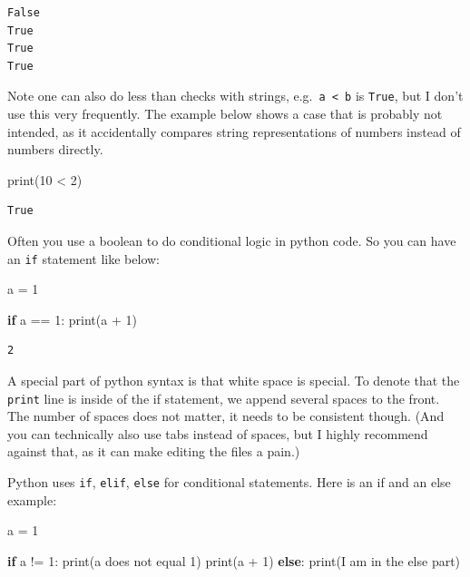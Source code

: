 \documentclass[
  letterpaper,
]{scrbook}
\newenvironment{Shaded}{\begin{snugshade}}{\end{snugshade}}
\newcommand{\BuiltInTok}[1]{\textcolor[rgb]{0.00,0.23,0.31}{#1}}
\newcommand{\ControlFlowTok}[1]{\textcolor[rgb]{0.00,0.23,0.31}{\textbf{#1}}}
\newcommand{\DecValTok}[1]{\textcolor[rgb]{0.68,0.00,0.00}{#1}}
\newcommand{\NormalTok}[1]{\textcolor[rgb]{0.00,0.23,0.31}{#1}}
\newcommand{\OperatorTok}[1]{\textcolor[rgb]{0.37,0.37,0.37}{#1}}
\newcommand{\StringTok}[1]{\textcolor[rgb]{0.13,0.47,0.30}{#1}}
\begin{document}
\begin{verbatim}
False
True
True
True
\end{verbatim}

Note one can also do less than checks with strings,
e.g.~\texttt{\textquotesingle{}a\textquotesingle{}\ \textless{}\ \textquotesingle{}b\textquotesingle{}}
is \texttt{True}, but I don't use this very frequently. The example
below shows a case that is probably not intended, as it accidentally
compares string representations of numbers instead of numbers directly.

\begin{Shaded}
\begin{Highlighting}[]
\BuiltInTok{print}\NormalTok{(}\StringTok{\textquotesingle{}10\textquotesingle{}} \OperatorTok{\textless{}} \StringTok{\textquotesingle{}2\textquotesingle{}}\NormalTok{)}
\end{Highlighting}
\end{Shaded}

\begin{verbatim}
True
\end{verbatim}

Often you use a boolean to do conditional logic in python code. So you
can have an \texttt{if} statement like below:

\begin{Shaded}
\begin{Highlighting}[]
\NormalTok{a }\OperatorTok{=} \DecValTok{1}

\ControlFlowTok{if}\NormalTok{ a }\OperatorTok{==} \DecValTok{1}\NormalTok{:}
  \BuiltInTok{print}\NormalTok{(a }\OperatorTok{+} \DecValTok{1}\NormalTok{)}
\end{Highlighting}
\end{Shaded}

\begin{verbatim}
2
\end{verbatim}

A special part of python syntax is that white space is special. To
denote that the \texttt{print} line is inside of the if statement, we
append several spaces to the front. The number of spaces does not
matter, it needs to be consistent though. (And you can technically also
use tabs instead of spaces, but I highly recommend against that, as it
can make editing the files a pain.)

Python uses \texttt{if}, \texttt{elif}, \texttt{else} for conditional
statements. Here is an if and an else example:

\begin{Shaded}
\begin{Highlighting}[]
\NormalTok{a }\OperatorTok{=} \DecValTok{1}

\ControlFlowTok{if}\NormalTok{ a }\OperatorTok{!=} \DecValTok{1}\NormalTok{:}
  \BuiltInTok{print}\NormalTok{(}\StringTok{\textquotesingle{}a does not equal 1\textquotesingle{}}\NormalTok{)}
  \BuiltInTok{print}\NormalTok{(a }\OperatorTok{+} \DecValTok{1}\NormalTok{)}
\ControlFlowTok{else}\NormalTok{:}
  \BuiltInTok{print}\NormalTok{(}\StringTok{\textquotesingle{}I am in the else part\textquotesingle{}}\NormalTok{)}
\end{Highlighting}
\end{Shaded}
\end{document}
